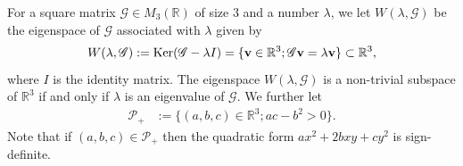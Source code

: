 \documentclass[11pt,a4paper,oneside]{amsart}
\theoremstyle{plain}
\theoremstyle{remark}
\numberwithin{equation}{section}
\newcommand{\R}{\mathbb{R}}
\DeclareMathOperator{\Ker}{Ker}
\theoremstyle{definition}
\begin{document}
For a square matrix $\mathscr{G}\in M_3(\R)$ of size $3$ and a number $\lambda$, we let $W(\lambda,\mathscr{G})$ be the eigenspace of $\mathscr{G}$ associated with $\lambda$ given by
\[
	W(\lambda, \mathscr{G}) :=\Ker(\mathscr{G}-\lambda I) = \{ {\bf v}\in \R^3 ; \mathscr{G}{\bf v} = \lambda {\bf v} \} \subset \R^3,
\]
where $I$ is the identity matrix.
The eigenspace
$W(\lambda, \mathscr{G})$ is a non-trivial subspace of $\R^3$
if and only if $\lambda$ is an eigenvalue of $\mathscr{G}$.
We further let
\begin{align*}
\mathcal{P}_+&:=\{(a,b,c) \in \R^3 ; ac-b^2>0\}.
\end{align*}
Note that if $(a,b,c) \in \mathcal{P}_+$ then the quadratic form $ax^2+2bxy+cy^2$ is sign-definite.
\end{document}
